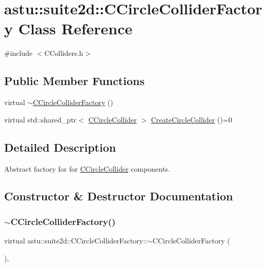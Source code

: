 \hypertarget{classastu_1_1suite2d_1_1CCircleColliderFactory}{}\section{astu\+:\+:suite2d\+:\+:C\+Circle\+Collider\+Factory Class Reference}
\label{classastu_1_1suite2d_1_1CCircleColliderFactory}


{\ttfamily \#include $<$C\+Colliders.\+h$>$}

\subsection*{Public Member Functions}
\begin{DoxyCompactItemize}
\item 
virtual \hyperlink{classastu_1_1suite2d_1_1CCircleColliderFactory_a10c0323ae13665f12a91a8ec996dec12}{$\sim$\+C\+Circle\+Collider\+Factory} ()
\item 
virtual std\+::shared\+\_\+ptr$<$ \hyperlink{classastu_1_1suite2d_1_1CCircleCollider}{C\+Circle\+Collider} $>$ \hyperlink{classastu_1_1suite2d_1_1CCircleColliderFactory_aa6a5f8005c8674ad1262619f085f6583}{Create\+Circle\+Collider} ()=0
\end{DoxyCompactItemize}


\subsection{Detailed Description}
Abstract factory for for \hyperlink{classastu_1_1suite2d_1_1CCircleCollider}{C\+Circle\+Collider} components. 

\subsection{Constructor \& Destructor Documentation}
\mbox{\label{classastu_1_1suite2d_1_1CCircleColliderFactory_a10c0323ae13665f12a91a8ec996dec12}} 
\subsubsection{\texorpdfstring{$\sim$\+C\+Circle\+Collider\+Factory()}{~CCircleColliderFactory()}}
{\footnotesize\ttfamily virtual astu\+::suite2d\+::\+C\+Circle\+Collider\+Factory\+::$\sim$\+C\+Circle\+Collider\+Factory (\begin{DoxyParamCaption}{ }\end{DoxyParamCaption})\hspace{0.3cm}{\ttfamily [inline]}, {\ttfamily [virtual]}}

